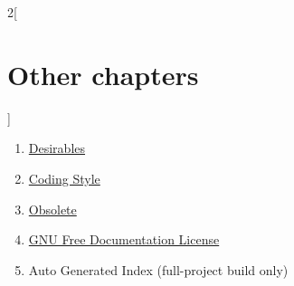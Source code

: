 \begin{multicols}{2}[\section{Other chapters}]
\begin{enumerate}
\item \href{https://github.com/stacks/stacks-project/blob/a04446e57ec1fbc252a871afcec7752fb2807b14/desirables.tex}{Desirables}
\item \href{https://github.com/stacks/stacks-project/blob/a04446e57ec1fbc252a871afcec7752fb2807b14/coding.tex}{Coding Style}
\item \href{https://github.com/stacks/stacks-project/blob/a04446e57ec1fbc252a871afcec7752fb2807b14/obsolete.tex}{Obsolete}
\item \href{https://github.com/stacks/stacks-project/blob/a04446e57ec1fbc252a871afcec7752fb2807b14/fdl.tex}{GNU Free Documentation License}
\item Auto Generated Index (full-project build only)
\end{enumerate}
\end{multicols}
